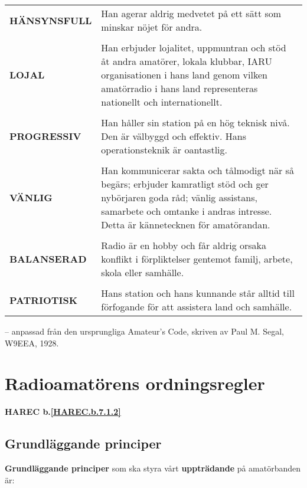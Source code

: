 \begin{tabular}{lp{9cm}}
  \textbf{HÄNSYNSFULL} &
     Han agerar aldrig medvetet på ett sätt som minskar nöjet för andra. \\
  & \\

  \textbf{LOJAL} &
     Han erbjuder lojalitet, uppmuntran och stöd åt andra amatörer, lokala klubbar, IARU organisationen i hans land genom vilken amatörradio i hans land representeras nationellt och internationellt.\\
  & \\

  \textbf{PROGRESSIV} &
Han håller sin station på en hög teknisk nivå. Den är välbyggd och effektiv. Hans operationsteknik är oantastlig.\\
  & \\

  \textbf{VÄNLIG} &
Han kommunicerar sakta och tålmodigt när så begärs; erbjuder kamratligt stöd och ger nybörjaren goda råd; vänlig assistans, samarbete och omtanke i andras intresse. Detta är kännetecknen för amatörandan.\\
  & \\

  \textbf{BALANSERAD} &
Radio är en hobby och får aldrig orsaka konflikt i förpliktelser gentemot familj, arbete, skola eller samhälle.\\
  & \\

  \textbf{PATRIOTISK} &
Hans station och hans kunnande står alltid till förfogande för att assistera land och samhälle.\\
\end{tabular}

-- anpassad från den ursprungliga Amateur's Code, skriven av Paul M. Segal, W9EEA, 1928.

\section[Ordningsregler]{Radioamatörens ordningsregler}
\textbf{HAREC
  b.\ref{HAREC.b.7.1.2}\label{myHAREC.b.7.1.2}
}

\subsection{Grundläggande principer}
\textbf{Grundläggande principer} som ska styra vårt \textbf{uppträdande} på
amatörbanden är:

